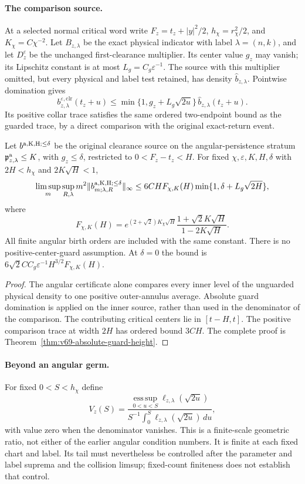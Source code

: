 \paragraph{The comparison source.}
At a selected normal critical word write $F_z=t_z+|y|^2/2$,
$h_\chi=r_\chi^2/2$, and $K_\chi=C\chi^{-2}$. Let
$B_{z,\lambda}$ be the exact physical indicator with label
$\lambda=(n,k)$, and let $D_z^\varepsilon$ be the unchanged
first-clearance multiplier. Its center value $g_z$ may vanish;
its Lipschitz constant is at most $L_g=C_g\varepsilon^{-1}$.
The source with this multiplier omitted, but every physical and
label test retained, has density $\widehat b_{z,\lambda}$.
Pointwise domination gives
\[
 b_{z,\lambda}^{\varepsilon,\mathrm{clr}}(t_z+u)
 \le\min\{1,g_z+L_g\sqrt{2u}\}\,
                       \widehat b_{z,\lambda}(t_z+u).
\]
Its positive collar trace satisfies the same ordered two-endpoint
bound as the guarded trace, by a direct comparison with the
original exact-return event.

\begin{leadtheorem}
\label{thm:intro-v69-zero-guard}
Let $b^{\rm a,K,H;\le\delta}$ be the original clearance source
on the angular-persistence stratum
$\mathfrak p^{\rm a}_{z,\lambda}\le K$, with $g_z\le\delta$,
restricted to $0<F_z-t_z<H$. For fixed
$\chi,\varepsilon,K,H,\delta$ with $2H<h_\chi$ and
$2K\sqrt H<1$,
\[
 \limsup_m\sup_{R,\lambda}m^2
       \|b^{\rm a,K,H;\le\delta}_{m;\lambda,R}\|_\infty
 \le6CH F_{\chi,K}(H)\min\{1,\delta+L_g\sqrt{2H}\},
\]
where
\[
 F_{\chi,K}(H)=e^{(2+\sqrt2)K_\chi\sqrt H}
                 \frac{1+\sqrt2K\sqrt H}{1-2K\sqrt H}.
\]
All finite angular birth orders are included with the same constant.
There is no positive-center-guard assumption. At $\delta=0$ the
bound is $6\sqrt2 C C_g\varepsilon^{-1}H^{3/2}F_{\chi,K}(H)$.
\end{leadtheorem}
\begin{proof}
The angular certificate alone compares every inner level of the
unguarded physical density to one positive outer-annulus average.
Absolute guard domination is applied on the inner source, rather
than used in the denominator of the comparison. The contributing
critical centers lie in $[t-H,t]$. The positive comparison trace at
width $2H$ has ordered bound $3CH$. The complete proof is
Theorem~\ref{thm:v69-absolute-guard-height}.
\end{proof}

\paragraph{Beyond an angular germ.}
For fixed $0<S<h_\chi$ define
\[
 V_z(S)=\frac{\operatorname*{ess\,sup}_{0<u<S}
                      \ell_{z,\lambda}(\sqrt{2u})}
                  {S^{-1}\int_0^S\ell_{z,\lambda}(\sqrt{2u})\,du},
\]
with value zero when the denominator vanishes. This is a finite-scale
geometric ratio, not either of the earlier angular condition numbers.
It is finite at each fixed chart and label. Its tail must nevertheless
be controlled after the parameter and label suprema and the collision
limsup; fixed-count finiteness does not establish that control.

